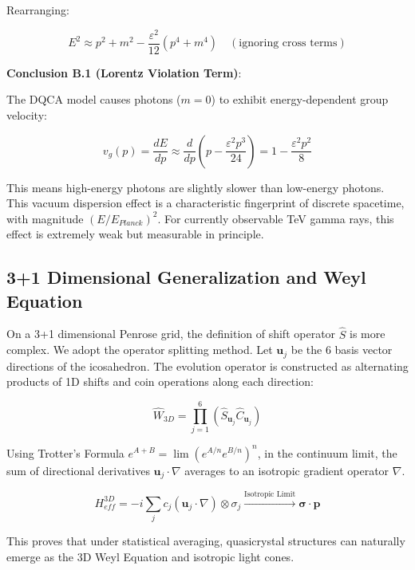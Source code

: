 Rearranging:

\[E^2 \approx p^2 + m^2 - \frac{\varepsilon^2}{12} (p^4 + m^4) \quad (\text{ignoring cross terms})\]

\textbf{Conclusion B.1 (Lorentz Violation Term)}:

The DQCA model causes photons ($m=0$) to exhibit energy-dependent group velocity:

\[v_g(p) = \frac{dE}{dp} \approx \frac{d}{dp} \left( p - \frac{\varepsilon^2 p^3}{24} \right) = 1 - \frac{\varepsilon^2 p^2}{8}\]

This means high-energy photons are slightly slower than low-energy photons. This vacuum dispersion effect is a characteristic fingerprint of discrete spacetime, with magnitude $(E/E_{Planck})^2$. For currently observable TeV gamma rays, this effect is extremely weak but measurable in principle.

\subsection{3+1 Dimensional Generalization and Weyl Equation}

On a 3+1 dimensional Penrose grid, the definition of shift operator $\hat{S}$ is more complex. We adopt the operator splitting method.
Let $\mathbf{u}_j$ be the 6 basis vector directions of the icosahedron. The evolution operator is constructed as alternating products of 1D shifts and coin operations along each direction:

\[\hat{W}_{3D} = \prod_{j=1}^6 \left( \hat{S}_{\mathbf{u}_j} \hat{C}_{\mathbf{u}_j} \right)\]

Using Trotter's Formula $e^{A+B} = \lim (e^{A/n} e^{B/n})^n$, in the continuum limit, the sum of directional derivatives $\mathbf{u}_j \cdot \nabla$ averages to an isotropic gradient operator $\nabla$.

\[H_{eff}^{3D} = -i \sum_{j} c_j (\mathbf{u}_j \cdot \nabla) \otimes \sigma_{j} \xrightarrow{\text{Isotropic Limit}} \boldsymbol{\sigma} \cdot \mathbf{p}\]

This proves that under statistical averaging, quasicrystal structures can naturally emerge as the 3D Weyl Equation and isotropic light cones.
